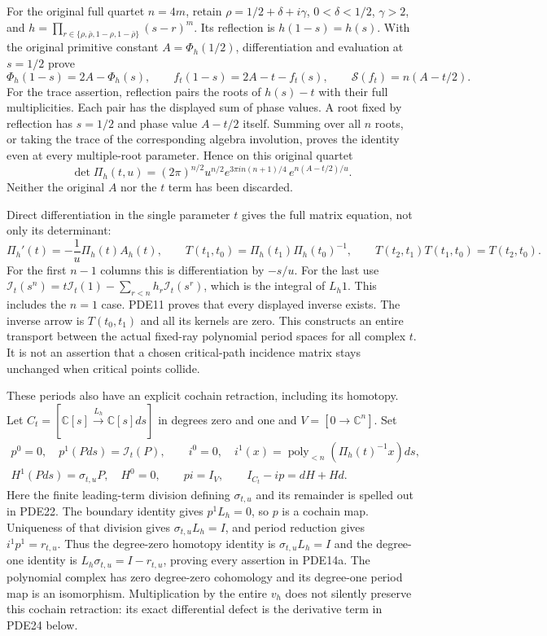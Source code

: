For the original full quartet $n=4m$, retain
$\rho=1/2+\delta+i\gamma$, $0<\delta<1/2$, $\gamma>2$, and
$h=\prod_{r\in\{\rho,\bar\rho,1-\rho,1-\bar\rho\}}(s-r)^m$.
Its reflection is $h(1-s)=h(s)$. With the original primitive constant
$A=\Phi_h(1/2)$, differentiation and evaluation at $s=1/2$ prove
\[
 \Phi_h(1-s)=2A-\Phi_h(s),\qquad
 f_t(1-s)=2A-t-f_t(s),\qquad
 \mathcal S(f_t)=n(A-t/2).
 \tag{PDE12}
\]
For the trace assertion, reflection pairs the roots of $h(s)-t$ with
their full multiplicities. Each pair has the displayed sum of phase
values. A root fixed by reflection has $s=1/2$ and phase value
$A-t/2$ itself. Summing over all $n$ roots, or taking the trace of the
corresponding algebra involution, proves the identity even at every
multiple-root parameter. Hence on this original quartet
\[
 \det\Pi_h(t,u)
  =(2\pi)^{n/2}u^{n/2}
       e^{3\pi i n(n+1)/4}\,e^{n(A-t/2)/u}.
 \tag{PDE13}
\]
Neither the original $A$ nor the $t$ term has been discarded.

Direct differentiation in the single parameter $t$ gives the full
matrix equation, not only its determinant:
\[
 \Pi_h'(t)=-\frac1u\Pi_h(t)A_h(t),\qquad
 T(t_1,t_0)=\Pi_h(t_1)\Pi_h(t_0)^{-1},\qquad
 T(t_2,t_1)T(t_1,t_0)=T(t_2,t_0).
 \tag{PDE14}
\]
For the first $n-1$ columns this is differentiation by $-s/u$.
For the last use
$\mathcal I_t(s^n)=t\mathcal I_t(1)-\sum_{r<n}h_r\mathcal I_t(s^r)$,
which is the integral of $L_h1$. This includes the $n=1$ case.
PDE11 proves that every displayed inverse exists. The inverse arrow
is $T(t_0,t_1)$ and all its kernels are zero. This constructs an entire
transport between the actual fixed-ray polynomial period spaces for
all complex $t$. It is not an assertion that a chosen critical-path
incidence matrix stays unchanged when critical points collide.

These periods also have an explicit cochain retraction, including its
homotopy. Let $C_t=[\mathbb{C}[s]\xrightarrow{L_h}\mathbb{C}[s]ds]$
in degrees zero and one and $V=[0\to\mathbb{C}^n]$. Set
\[
 \begin{gathered}
 p^0=0,\quad p^1(Pds)=\mathcal I_t(P),\qquad
 i^0=0,\quad i^1(x)=\operatorname{poly}_{<n}(\Pi_h(t)^{-1}x)ds,\\
 H^1(Pds)=\sigma_{t,u}P,\quad H^0=0,\qquad
 pi=I_V,\qquad I_{C_t}-ip=dH+Hd.
 \end{gathered}
 \tag{PDE14a}
\]
Here the finite leading-term division defining $\sigma_{t,u}$ and its
remainder is spelled out in PDE22. The boundary identity gives
$p^1L_h=0$, so $p$ is a cochain map. Uniqueness of that division gives
$\sigma_{t,u}L_h=I$, and period reduction gives
$i^1p^1=r_{t,u}$. Thus the degree-zero homotopy identity is
$\sigma_{t,u}L_h=I$ and the degree-one identity is
$L_h\sigma_{t,u}=I-r_{t,u}$, proving every assertion in PDE14a.
The polynomial complex has zero degree-zero cohomology and its
degree-one period map is an isomorphism. Multiplication by the entire
$v_h$ does not silently preserve this cochain retraction: its exact
differential defect is the derivative term in PDE24 below.


